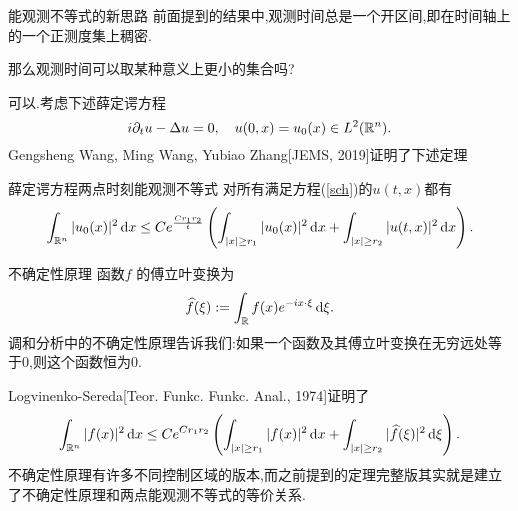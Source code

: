 \iffalse\begin{frame}[t]
  考虑薛定谔方程 
  \begin{equation}\label{sch}
    i\partial_t u -\Delta u=0,\quad u(0,x)=u_0(x)\in L^2(\R^{n}).
  \end{equation}
 能观测不等式是指下述形式的不等式
 \begin{equation}
   \int_{\Omega}|u(T,x)|^2\,\mathrm{d}x\le C(T,\Omega)\int_{0}^{T}\int_{\omega}|u(t,x)|^2\,\mathrm{d}x\mathrm{d}t,
 \end{equation}
 这里$\omega\subset \Omega$.
 \begin{itemize}
   \item Rosier-Zhang[JDE,2009]证明了全空间情形下有界区域外的可观测性, 即$\omega$ 可取为任意半径的球外.
   \item Jaffard[PM,1990], Komornik-Loreti[2005]证明周期边界条件下任意开集上的可观测性,即$\omega$ 可取为任意开集.
 \end{itemize}
\end{frame}
\fi



\begin{frame}[t]{能观测不等式的新思路}
  前面提到的结果中,观测时间总是一个开区间,即在时间轴上的一个正测度集上稠密.
  
  那么观测时间可以取某种意义上更小的集合吗?

  可以.考虑下述薛定谔方程
  \begin{equation}
    i\partial_t u-\Delta u=0,\quad u(0,x)=u_0(x)\in L^2(\mathbb{R}^n).\label{sch}
  \end{equation}
Gengsheng Wang, Ming Wang, Yubiao Zhang[JEMS, 2019]证明了下述定理
  \begin{alertblock}{薛定谔方程两点时刻能观测不等式} 
    对所有满足方程(\ref{sch})的$u(t,x)$都有
  \begin{equation}\label{obsch}
    \int_{\mathbb{R}^{n}}|u_0(x)|^2\,\mathrm{d}x\le Ce^{\frac{Cr_1 r_2}{t}}\left( \int_{|x|\ge r_1}|u_0(x)|^2\,\mathrm{d}x+\int_{|x|\ge r_2}|u(t,x)|^2 \,\mathrm{d}x \right).
  \end{equation}
  \end{alertblock}
\end{frame}

\begin{frame}[t]{不确定性原理}
  函数$f$ 的傅立叶变换为
  \begin{equation}
    \widehat{f}(\xi):=\int_{\mathbb{R}} f(x)e^{-ix\cdot \xi}\,\mathrm{d}\xi.
  \end{equation}
  调和分析中的不确定性原理告诉我们:如果一个函数及其傅立叶变换在无穷远处等于$0$,则这个函数恒为$0$.


  Logvinenko-Sereda[Teor. Funkc. Funkc. Anal., 1974]证明了
 \begin{equation}\label{unc}
   \int_{\mathbb{R}^{n}}|f(x)|^2\,\mathrm{d}x\le C e^{Cr_1r_2}\left( \int_{|x|\ge r_1}|f(x)|^2\,\mathrm{d}x+\int_{|x|\ge r_2}|\widehat{f}(\xi)|^2\,\mathrm{d}\xi \right).
 \end{equation}
 不确定性原理有许多不同控制区域的版本,而之前提到的定理完整版其实就是建立了不确定性原理和两点能观测不等式的等价关系.
\end{frame}

